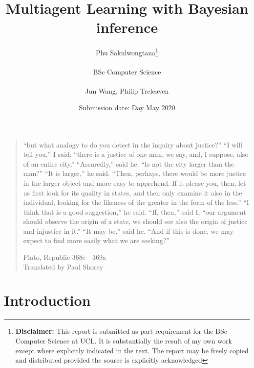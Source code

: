 \documentclass{report}
\title{{{\Huge Multiagent Learning with Bayesian inference}}\\
}
\date{Submission date: Day May 2020}
\author{Phu Sakulwongtana\thanks{
{\bf Disclaimer:}
This report is submitted as part requirement for the BSc Computer Science at UCL. It is
substantially the result of my own work except where explicitly indicated in the text.
The report may be freely copied and distributed provided the source is explicitly acknowledged
}
\\ \\
BSc Computer Science\\ \\
Jun Wang, Philip Treleaven}
\newcommand{\correctquote}[1]{``#1''}
\newenvironment{outline} {\renewcommand\abstractname{}\begin{abstract}} {\end{abstract}}
\begin{document}
 
\onehalfspacing
\maketitle

\begin{abstract}

\end{abstract}

\clearpage
\vspace*{\fill}
\thispagestyle{empty} %
\begin{quotation}
\correctquote{but what analogy to do you detect in the inquiry about justice?} \correctquote{I will tell you,} I said: \correctquote{there is a justice of one man, we say, and, I suppose, also of an entire city.} \correctquote{Assuredly,} said he. \correctquote{Is not the city larger than the man?} \correctquote{It is larger,} he said. \correctquote{Then, perhaps, there would be more justice in the larger object and more easy to apprehend. If it please you, then, let us first look for its quality in states, and then only examine it also in the individual, looking for the likeness of the greater in the form of the less.} \correctquote{I think that is a good suggestion,} he said. \correctquote{If, then,} said I, \correctquote{our argument should observe the origin of a state, we should see also the origin of justice and injustice in it.} \correctquote{It may be,} said he. \correctquote{And if this is done, we may expect to find more easily what we are seeking?}

\medskip
\raggedleft
Plato, Republic 368e - 369a \\
Translated by Paul Shorey \cite{gregory_crane}
\end{quotation}
\vspace*{\fill}

\setcounter{tocdepth}{1}
\tableofcontents

\begin{outline}

\end{outline}

\setcounter{page}{1}


\chapter{Introduction}

\end{document}
